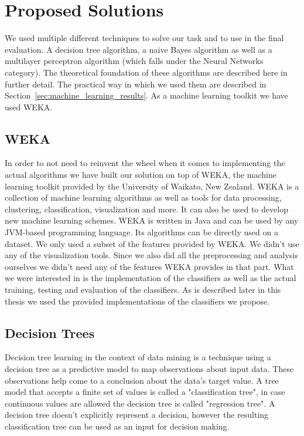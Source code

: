 \section{Proposed Solutions}
\label{sec:proposed_solution}
We used multiple different techniques to solve our task and to use in the final evaluation. A decision tree algorithm, a naive Bayes algorithm as well as a multilayer perceptron algorithm (which falls under the Neural Networks category). The theoretical foundation of these algorithms are described here in further detail. The practical way in which we used them are described in Section~\ref{sec:machine_learning_results}. As a machine learning toolkit we have used WEKA.

\subsection{WEKA}
\label{subsection:WEKA}
In order to not need to reinvent the wheel when it comes to implementing the actual algorithms we have built our solution on top of WEKA, the machine learning toolkit provided by the University of Waikato, New Zealand. WEKA is a collection of machine learning algorithms as well as tools for data processing, clustering, classification, visualization and more. It can also be used to develop new machine learning schemes. WEKA is written in Java and can be used by any JVM-based programming language. Its algorithms can be directly used on a dataset. We only used a subset of the features provided by WEKA. We didn't use any of the visualization tools. Since we also did all the preprocessing and analysis ourselves we didn't need any of the features WEKA provides in that part. What we were interested in is the implementation of the classifiers as well as the actual training, testing and evaluation of the classifiers. As is described later in this thesis we used the provided implementations of the classifiers we propose. 

\subsection{Decision Trees}
Decision tree learning in the context of data mining is a technique using a decision tree as a predictive model to map observations about input data. These observations help come to a conclusion about the data's target value. A tree model that accepts a finite set of values is called a "classification tree", in case continuous values are allowed the decision tree is called "regression tree". A decision tree doesn't explicitly represent a decision, however the resulting classification tree can be used as an input for decision making. 

